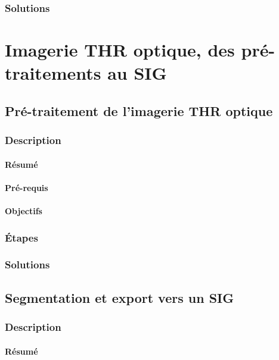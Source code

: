 \documentclass[a4paper,11pt,twoside,openright]{article}
\begin{document}
\subsubsection{Solutions}
\label{sec-2-3-3}
\section{Imagerie THR optique, des pré-traitements au SIG}
\label{sec-3}
\subsection{Pré-traitement de l'imagerie THR optique}
\label{sec-3-1}
\subsubsection{Description}
\label{sec-3-1-1}
\paragraph{Résumé}
\label{sec-3-1-1-1}

\paragraph{Pré-requis}
\label{sec-3-1-1-2}


\paragraph{Objectifs}
\label{sec-3-1-1-3}

\subsubsection{Étapes}
\label{sec-3-1-2}

\subsubsection{Solutions}
\label{sec-3-1-3}
\subsection{Segmentation et export vers un SIG}
\label{sec-3-2}
\subsubsection{Description}
\label{sec-3-2-1}
\paragraph{Résumé}
\label{sec-3-2-1-1}
\end{document}
